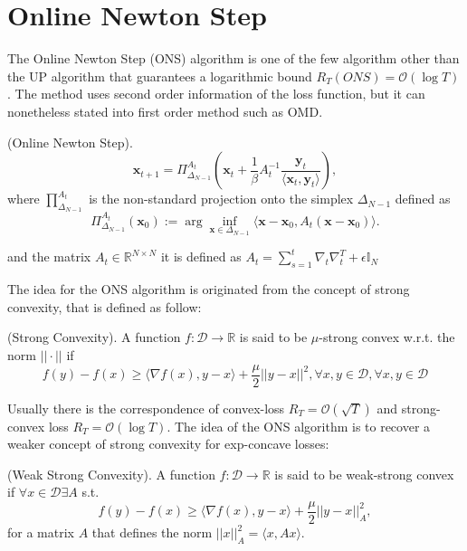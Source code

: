 \section{Online Newton Step}

The Online Newton Step (ONS) \cite{hazan2007logarithmic} algorithm is one of the few algorithm other than the UP algorithm that guarantees a logarithmic bound $R_T(ONS)=\mathcal O(\log T)$. The method uses second order information of the loss function, but it can nonetheless stated into first order method such as OMD. 

\begin{definition}(Online Newton Step).
\begin{equation}\label{eq:update_EG}
\mathbf x_{t+1}=\Pi^{A_t}_{\Delta_{N-1}}\left(\mathbf x_t+\frac{1}{\beta}A_t^{-1}\frac{\mathbf y_t}{\langle\mathbf x_t,\mathbf y_t\rangle}\right),
\end{equation}
where $\prod^{A_t}_{\Delta_{N-1}}$ is the non-standard projection onto the simplex $\Delta_{N-1}$ defined as 
$$\Pi^{A_t}_{\Delta_{N-1}}(\mathbf x_0):=\arg\inf\limits_{\mathbf x\in\Delta_{N-1}}\langle\mathbf x-\mathbf x_0,A_t(\mathbf x-\mathbf x_0)\rangle.$$

and the matrix $A_t\in\mathbb R^{N\times N}$ it is defined as $A_t=\sum\limits_{s=1}^t \nabla_t\nabla_t^T+\epsilon\mathbb I_N$ 
\end{definition}

The idea for the ONS algorithm is originated from the concept of strong convexity, that is defined as follow:

\begin{definition}(Strong Convexity).\label{def:strong_cnvx}
A function $f:\mathcal D\to\mathbb R$ is said to be $\mu$-strong convex w.r.t. the norm $||\cdot||$ if 
$$f(y)-f(x)\ge\langle\nabla f(x),y-x\rangle+\frac{\mu}{2}||y-x||^2,\forall x,y\in\mathcal D,\forall x,y\in\mathcal D$$
\end{definition}

Usually there is the correspondence of convex-loss $R_T=\mathcal O(\sqrt T)$ and strong-convex loss $R_T=\mathcal O(\log T)$. The idea of the ONS algorithm is to recover a weaker concept of strong convexity for exp-concave losses:

\begin{definition}(Weak Strong Convexity).\label{def:weak_strong_cnvx}
A function $f:\mathcal D\to\mathbb R$ is said to be weak-strong convex if $\forall x\in\mathcal D\exists A$ s.t. 
$$f(y)-f(x)\ge\langle\nabla f(x),y-x\rangle+\frac{\mu}{2}||y-x||_{A}^2,$$
for a matrix $A$ that defines the norm $||x||^2_{A}=\langle x, Ax\rangle$.
\end{definition}

